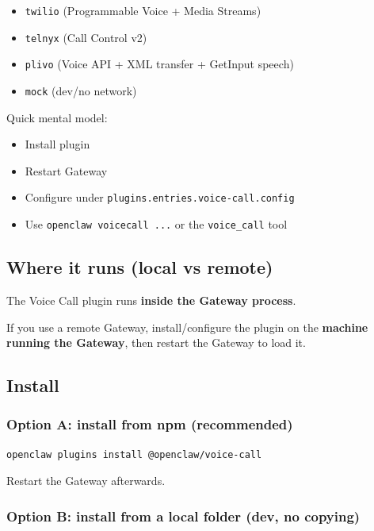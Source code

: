 \begin{itemize}
  \item \texttt{twilio} (Programmable Voice + Media Streams)
  \item \texttt{telnyx} (Call Control v2)
  \item \texttt{plivo} (Voice API + XML transfer + GetInput speech)
  \item \texttt{mock} (dev/no network)
\end{itemize}


Quick mental model:

\begin{itemize}
  \item Install plugin
  \item Restart Gateway
  \item Configure under \texttt{plugins.entries.voice-call.config}
  \item Use \texttt{openclaw voicecall ...} or the \texttt{voice\_call} tool
\end{itemize}


\subsection{Where it runs (local vs remote)}


The Voice Call plugin runs \textbf{inside the Gateway process}.

If you use a remote Gateway, install/configure the plugin on the \textbf{machine running the Gateway}, then restart the Gateway to load it.

\subsection{Install}


\subsubsection{Option A: install from npm (recommended)}


\begin{lstlisting}[language=bash]
openclaw plugins install @openclaw/voice-call
\end{lstlisting}


Restart the Gateway afterwards.

\subsubsection{Option B: install from a local folder (dev, no copying)}


